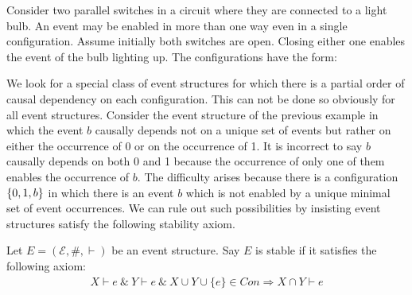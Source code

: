 \documentclass{article}
\begin{document}
\begin{example}
    Consider two parallel switches in a circuit where they are connected
    to a light bulb.
    An event may be enabled in more than one way even in a single configuration.
    Assume initially both switches are open.
    Closing either one enables the event of the bulb lighting up.
    The configurations have the form:

    \begin{center}
    \end{center}
\end{example}

We look for a special class of event structures for which there is a
partial order of causal dependency on each configuration.
This can not be done so obviously for all event structures.
Consider the event structure of the previous example in which
the event $b$ causally depends not on a unique set of events
but rather on either the occurrence of 0 or on the occurrence of 1.
It is incorrect to say $b$ causally depends on both 0 and 1 because
the occurrence of only one of them enables the occurrence of $b$.
The difficulty arises because there is a configuration $\{0,1,b\}$
in which there is an event $b$ which is not enabled by a unique minimal
set of event occurrences.
We can rule out such possibilities by insisting event structures
satisfy the following stability axiom.

\begin{definition}
    Let $E = (\mathcal{E},\#,\vdash)$ be an event structure. Say $E$ is stable if it satisfies the following axiom:
    \begin{align*}
        X \vdash e \ \& \ Y \vdash e \ \& \ X \cup Y \cup \{e\} \in Con \Rightarrow X \cap Y \vdash e
    \end{align*}
\end{definition}
\end{document}
